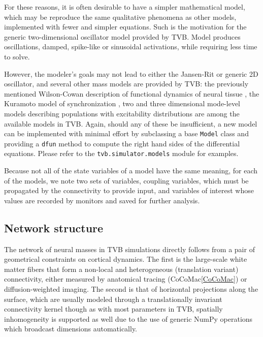	For these reasons, it is often desirable to have a simpler mathematical 
	model, which may be reproduce the same qualitative phenomena as other 
	models, implemented with fewer and simpler equations. Such is the motivation
	for the generic two-dimensional oscillator model provided by TVB. 
	 Model produces oscillations, damped, spike-like or 
	sinusoidal activations, while requiring less time to solve.

	However, the modeler's goals may not lead to either the Jansen-Rit or 
	generic 2D oscillator, and several other mass models are provided by TVB:
	the previously mentioned Wilson-Cowan description of functional dynamics of
	neural tissue \cite{Wilson_1972}, the Kuramoto model of synchronization \cite{Kuramoto1975}, two and 
	three dimensional mode-level models describing populations with 
	excitability distributions \cite{Stefanescu_2011, Stefanescu_2008} are
	among the available models in TVB.  
	Again, should any of these be insufficient, a new model can be implemented
	with minimal effort by subclassing a base \texttt{Model} class and providing a 
	\texttt{dfun} method to compute the right hand sides of the differential 
	equations. Please refer to the \texttt{tvb.simulator.models} module for 
	examples.

	Because not all of the state variables of a model have the same meaning,
	for each of the models, we note two sets of variables, 
	coupling variables, which must be propagated by the connectivity to 
	provide input, and variables of interest whose values are recorded by
	monitors and saved for further analysis. 

\subsection{Network structure}

	The network of neural masses in TVB simulations directly follows from 
	a pair of 
	geometrical constraints on cortical dynamics. The first is the 
	large-scale white matter fibers that form a non-local and heterogeneous
	(translation variant) connectivity, either measured by anatomical
	tracing (CoCoMac\ref{CoCoMac}) or diffusion-weighted imaging. The second
	is that of horizontal projections along the surface, which are 
	usually modeled through a translationally invariant connectivity kernel
	though as with most parameters in TVB, spatially inhomogeneity
	is supported as well due to the use of generic NumPy operations which
	broadcast dimensions automatically. 

